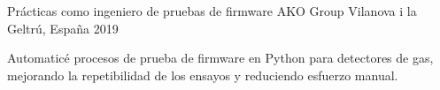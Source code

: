\cventry
  {Pr\'acticas como ingeniero de pruebas de firmware}
  {AKO Group}
  {Vilanova i la Geltr\'u, Espa\~na}
  {2019}
  {
    \begin{cvitems}
      \item {Automatic\'e procesos de prueba de firmware en Python para detectores de gas, mejorando la repetibilidad de los ensayos y reduciendo esfuerzo manual.}
    \end{cvitems}
  }
